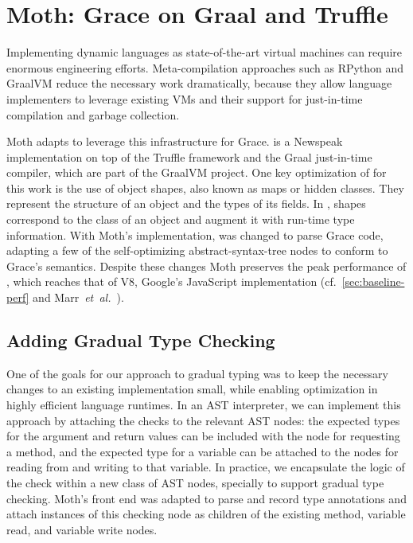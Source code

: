 
\section{Moth: Grace on Graal and Truffle}
\label{ssec:moth}
\label{sec:method}

Implementing dynamic languages as state-of-the-art virtual machines
can require enormous engineering efforts.
Meta-compilation approaches\citep{Marr:2015:MTPE}
such as RPython\citep{Bolz:2009:TMP,Bolz:2013:IMT}
and GraalVM\citep{Wurthinger2013,Wurthinger:2017:PPE}
reduce the necessary work dramatically,
because they allow language implementers to leverage existing VMs
and their support for just-in-time compilation and garbage collection.

Moth\citep{Roberts2017} adapts \SOMns\citep{SOMns} to leverage this infrastructure for Grace.
\SOMns is a Newspeak implementation\citep{Bracha:10:NS} on top of the Truffle framework and the Graal just-in-time compiler,
which are part of the GraalVM project.
One key optimization of \SOMns for this work is the use of
object shapes\citep{woss2014object},
also known as maps\citep{Self} or hidden classes.
They represent the structure of an object and the types of its fields.
In \SOMns, shapes correspond to the class of an object and augment it with
run-time type information.
%
%
With Moth's implementation,
\SOMns was changed to parse Grace code,
adapting a few of the self-optimizing abstract-syntax-tree nodes
to conform to Grace's semantics.
Despite these changes Moth
preserves the peak performance of \SOMns,
which reaches that of V8,
Google's JavaScript implementation
(cf.\ \cref{sec:baseline-perf} and Marr~\textit{et~al.}~\cite{Marr2016}).

\subsection{Adding Gradual Type Checking} 
\label{ssec:implementation} 



One of the goals for our approach to gradual typing was to keep
the necessary changes to an existing implementation small,
while enabling optimization in highly efficient language runtimes.
%
In an AST interpreter, we can implement this approach by attaching the
checks to the relevant AST nodes: the expected types for the argument
and return values can be included with the node for requesting a
method, and the expected type for a variable can be attached to the
nodes for reading from and writing to that variable.  In practice, we
encapsulate the logic of the check within a new class of AST
nodes, specially to support gradual type checking.  Moth's front end was adapted to parse and record type
annotations and attach instances of this checking node as children of the
existing method, variable read, and variable write nodes.


